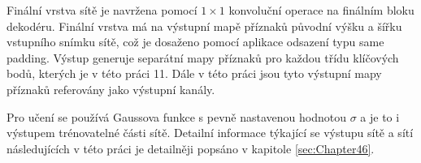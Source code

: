 Finální vrstva sítě je navržena pomocí $1\times1$ konvoluční operace na finálním bloku dekodéru. Finální vrstva má na výstupní mapě příznaků původní výšku a šířku vstupního snímku sítě, což je dosaženo pomocí aplikace odsazení typu same padding. Výstup generuje separátní mapy příznaků pro každou třídu klíčových bodů, kterých je v této práci 11. Dále v této práci jsou tyto výstupní mapy příznaků referovány jako výstupní kanály.

Pro učení se používá Gaussova funkce s pevně nastavenou hodnotou $\sigma$ a je to i výstupem trénovatelné části sítě. Detailní informace týkající se výstupu sítě a sítí následujících v této práci je detailněji popsáno v kapitole \ref{sec:Chapter46}.
\endinput